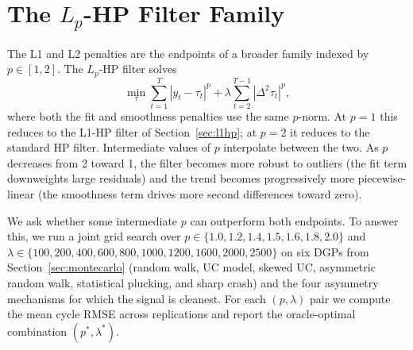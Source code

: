 \documentclass[10pt]{article}
\begin{document}

\section{The $L_p$-HP Filter Family}
\label{app:lp_filter}

The L1 and L2 penalties are the endpoints of a broader family indexed by $p \in [1, 2]$. The $L_p$-HP filter solves
\begin{equation}
\min_{\tau} \sum_{t=1}^{T} |y_t - \tau_t|^p + \lambda \sum_{t=2}^{T-1} |\Delta^2 \tau_t|^p,
\label{eq:lp_hp}
\end{equation}
where both the fit and smoothness penalties use the same $p$-norm. At $p = 1$ this reduces to the L1-HP filter of Section~\ref{sec:l1hp}; at $p = 2$ it reduces to the standard HP filter. Intermediate values of $p$ interpolate between the two. As $p$ decreases from 2 toward 1, the filter becomes more robust to outliers (the fit term downweights large residuals) and the trend becomes progressively more piecewise-linear (the smoothness term drives more second differences toward zero).

We ask whether some intermediate $p$ can outperform both endpoints. To answer this, we run a joint grid search over $p \in \{1.0, 1.2, 1.4, 1.5, 1.6, 1.8, 2.0\}$ and $\lambda \in \{100, 200, 400, 600, 800, 1000, 1200, 1600, 2000, 2500\}$ on six DGPs from Section~\ref{sec:montecarlo} (random walk, UC model, skewed UC, asymmetric random walk, statistical plucking, and sharp crash) and the four asymmetry mechanisms for which the signal is cleanest. For each $(p, \lambda)$ pair we compute the mean cycle RMSE across replications and report the oracle-optimal combination $(p^*, \lambda^*)$.
\end{document}
